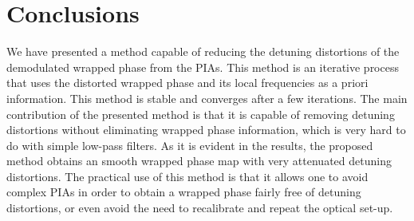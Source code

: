 \section{Conclusions}
We have presented a method capable of reducing the 
detuning distortions of the demodulated wrapped phase from the PIAs. This 
method is an iterative process that uses the distorted wrapped phase and 
its local frequencies as a priori information. This method is stable and 
converges after a few iterations. The main contribution of the presented 
method is that it is capable of removing detuning distortions without 
eliminating wrapped phase information, which is very hard to do with 
simple low-pass filters. As it is evident in the results, the proposed 
method obtains an smooth wrapped phase map with very attenuated detuning 
distortions. The practical use of this method is that it allows one to avoid 
complex PIAs in order to obtain a wrapped phase fairly free of detuning 
distortions, or even avoid the need to recalibrate and repeat the optical 
set-up.




 
  
  
